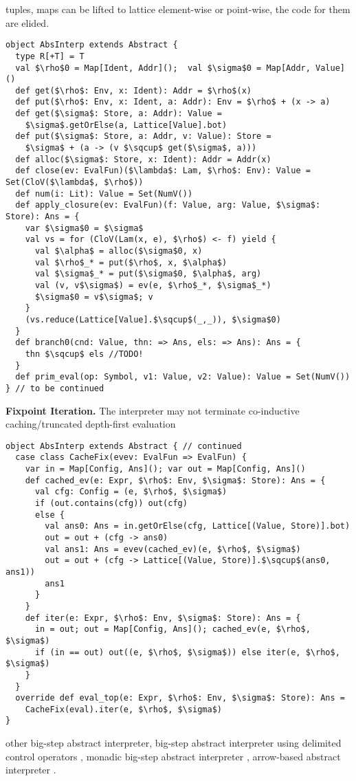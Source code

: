 tuples, maps can be lifted to lattice element-wise or point-wise, the code for them are elided.


\begin{lstlisting}
object AbsInterp extends Abstract {
  type R[+T] = T
  val $\rho$0 = Map[Ident, Addr]();  val $\sigma$0 = Map[Addr, Value]()
  def get($\rho$: Env, x: Ident): Addr = $\rho$(x)
  def put($\rho$: Env, x: Ident, a: Addr): Env = $\rho$ + (x -> a)
  def get($\sigma$: Store, a: Addr): Value = 
    $\sigma$.getOrElse(a, Lattice[Value].bot)
  def put($\sigma$: Store, a: Addr, v: Value): Store =
    $\sigma$ + (a -> (v $\sqcup$ get($\sigma$, a)))
  def alloc($\sigma$: Store, x: Ident): Addr = Addr(x)
  def close(ev: EvalFun)($\lambda$: Lam, $\rho$: Env): Value = Set(CloV($\lambda$, $\rho$))
  def num(i: Lit): Value = Set(NumV())
  def apply_closure(ev: EvalFun)(f: Value, arg: Value, $\sigma$: Store): Ans = {
    var $\sigma$0 = $\sigma$
    val vs = for (CloV(Lam(x, e), $\rho$) <- f) yield {
      val $\alpha$ = alloc($\sigma$0, x)
      val $\rho$_* = put($\rho$, x, $\alpha$)
      val $\sigma$_* = put($\sigma$0, $\alpha$, arg)
      val (v, v$\sigma$) = ev(e, $\rho$_*, $\sigma$_*)
      $\sigma$0 = v$\sigma$; v
    }
    (vs.reduce(Lattice[Value].$\sqcup$(_,_)), $\sigma$0)
  }
  def branch0(cnd: Value, thn: => Ans, els: => Ans): Ans = {
    thn $\sqcup$ els //TODO!
  }
  def prim_eval(op: Symbol, v1: Value, v2: Value): Value = Set(NumV())
} // to be continued
\end{lstlisting}

\textbf{Fixpoint Iteration.}
The interpreter may not terminate
co-inductive caching/truncated depth-first evaluation \cite{DBLP:journals/pacmpl/DaraisLNH17, Wei:2018:RAA:3243631.3236800, Rosendahl:AbsIntPL}

\begin{lstlisting}
object AbsInterp extends Abstract { // continued
  case class CacheFix(evev: EvalFun => EvalFun) {
    var in = Map[Config, Ans](); var out = Map[Config, Ans]()
    def cached_ev(e: Expr, $\rho$: Env, $\sigma$: Store): Ans = {
      val cfg: Config = (e, $\rho$, $\sigma$)
      if (out.contains(cfg)) out(cfg)
      else {
        val ans0: Ans = in.getOrElse(cfg, Lattice[(Value, Store)].bot)
        out = out + (cfg -> ans0)
        val ans1: Ans = evev(cached_ev)(e, $\rho$, $\sigma$)
        out = out + (cfg -> Lattice[(Value, Store)].$\sqcup$(ans0, ans1))
        ans1
      }
    }
    def iter(e: Expr, $\rho$: Env, $\sigma$: Store): Ans = {
      in = out; out = Map[Config, Ans](); cached_ev(e, $\rho$, $\sigma$)
      if (in == out) out((e, $\rho$, $\sigma$)) else iter(e, $\rho$, $\sigma$)
    }
  }
  override def eval_top(e: Expr, $\rho$: Env, $\sigma$: Store): Ans = 
    CacheFix(eval).iter(e, $\rho$, $\sigma$)
}
\end{lstlisting}

other big-step abstract interpreter, 
big-step abstract interpreter using delimited control operators \cite{Wei:2018:RAA:3243631.3236800},
monadic big-step abstract interpreter \cite{DBLP:journals/pacmpl/DaraisLNH17},
arrow-based abstract interpreter \cite{Keidel:2018:CSP:3243631.3236767}.

